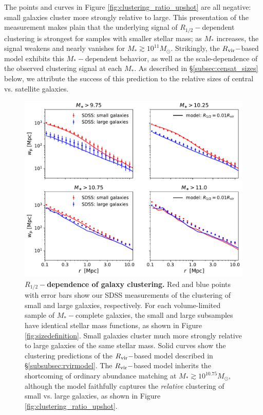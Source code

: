 \documentclass[usenatbib,usegraphicx,letterpaper]{mn2e}
\newcommand{\rhalf}{R_{1/2}}
\newcommand{\mstar}{M_{\ast}}
\newcommand{\rvir}{R_{\rm vir}}
\newcommand{\msun}{M_\odot}
\begin{document}
The points and curves in Figure \ref{fig:clustering_ratio_upshot} are all negative: small galaxies cluster more strongly relative to large. This presentation of the measurement makes plain that the underlying signal of $\rhalf-$dependent clustering is strongest for samples with smaller stellar mass; as $\mstar$ increases, the signal weakens and nearly vanishes for $\mstar\gtrsim10^{11}\msun.$ Strikingly, the $\rvir-$based model exhibits this $\mstar-$dependent behavior, as well as the scale-dependence of the observed clustering signal at each $\mstar.$ As described in \S\ref{subsec:censat_sizes} below, we attribute the success of this prediction to the relative sizes of central vs. satellite galaxies. 

\begin{figure}
\centering
\includegraphics[width=12cm]{FIGS/rvir_only_wp_large_small_absolute.pdf}
\caption{
{\bf $\rhalf-$dependence of galaxy clustering.}
Red and blue points with error bars show our SDSS measurements of the clustering of small and large galaxies, respectively. For each volume-limited sample of $\mstar-$complete galaxies, the small and large subsamples have identical stellar mass functions, as shown in Figure \ref{fig:sizedefinition}. Small galaxies cluster much more strongly relative to large galaxies of the same stellar mass. Solid curves show the clustering predictions of the $\rvir-$based model described in \S\ref{subsubsec:rvirmodel}. The $\rvir-$based model inherits the shortcoming of ordinary abundance matching at $\mstar\gtrsim10^{10.75}\msun,$ although the model faithfully captures the {\em relative} clustering of small vs. large galaxies, as shown in Figure \ref{fig:clustering_ratio_upshot}.
}
\label{fig:rvir_only_clustering_absolute}
\end{figure}
\end{document}
